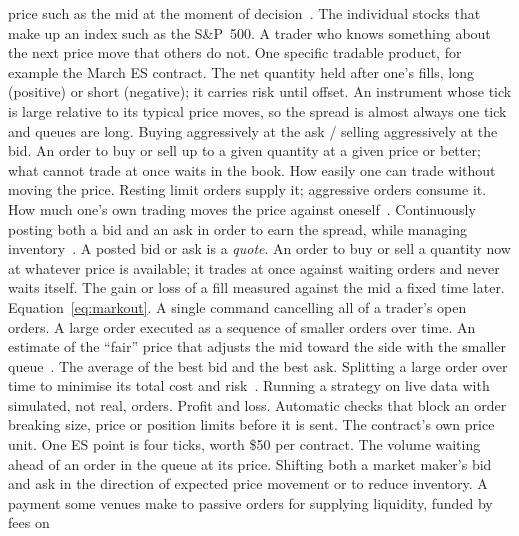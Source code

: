 \begin{description}[leftmargin=1.2em,style=sameline,itemsep=1pt,font=\normalfont\bfseries]
  price such as the mid at the moment of decision~\citep{harris2003}.
 The individual stocks that make up an index such as the S\&P~500.
 A trader who knows something about the next price move that others do not.
 One specific tradable product, for example the March ES contract.
 The net quantity held after one's fills, long (positive) or short
  (negative); it carries risk until offset.
 An instrument whose tick is large relative to its typical price moves, so the
  spread is almost always one tick and queues are long.
 Buying aggressively at the ask / selling aggressively at
  the bid.
 An order to buy or sell up to a given quantity at a given price or better; what
  cannot trade at once waits in the book.
 How easily one can trade without moving the price. Resting limit orders supply it;
  aggressive orders consume it.
 How much one's own trading moves the price against oneself~\citep{bouchaud2018}.
 Continuously posting both a bid and an ask in order to earn the spread, while
  managing inventory~\citep{avellaneda2008,cartea2015}. A posted bid or ask is a \emph{quote}.
 An order to buy or sell a quantity now at whatever price is available; it trades
  at once against waiting orders and never waits itself.
 The gain or loss of a fill measured against the mid a fixed time later.
  Equation~\eqref{eq:markout}.
 A single command cancelling all of a trader's open orders.
 A large order executed as a sequence of smaller orders over time.
 An estimate of the ``fair'' price that adjusts the mid toward the side with the
  smaller queue~\citep{stoikov2018}.
 The average of the best bid and the best ask.
 Splitting a large order over time to minimise its total cost and
  risk~\citep{almgren2001}.
 Running a strategy on live data with simulated, not real, orders.
 Profit and loss.
 Automatic checks that block an order breaking size, price or position limits
  before it is sent.
 The contract's own price unit. One ES point is four ticks, worth \$50 per
  contract.
 The volume waiting ahead of an order in the queue at its price.
 Shifting both a market maker's bid and ask in the direction of expected price movement or to reduce inventory.
 A payment some venues make to passive orders for supplying liquidity, funded by fees on

\end{description}
